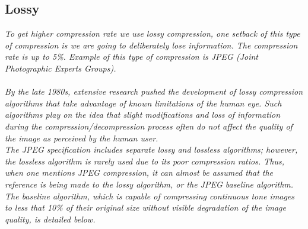 \documentclass[12pt, letterpaper]{article}
\begin{document}
\subsection{{\color{gray}Lossy}}
\textit{ To get higher compression rate we use lossy compression, one setback of this type of compression is we are going to deliberately lose information. The compression rate is up to 5\%. Example of this type of compression is JPEG (Joint Photographic Experts Groups). }
\paragraph{}\textit{By the late 1980s, extensive research pushed the development of lossy compression algorithms that take advantage of known limitations of the human eye. Such algorithms play on the idea that slight modifications and loss of information during the compression/decompression process often do not affect the quality of the image as perceived by the human user. \\The JPEG specification includes separate lossy and lossless algorithms; however, the lossless algorithm is rarely used due to its poor compression ratios. Thus, when one mentions JPEG compression, it can almost be assumed that the reference is being made to the lossy algorithm, or the JPEG baseline algorithm. The baseline algorithm, which is capable of compressing continuous tone images to less that 10\% of their original size without visible degradation of the image quality, is detailed below.}
\end{document}
